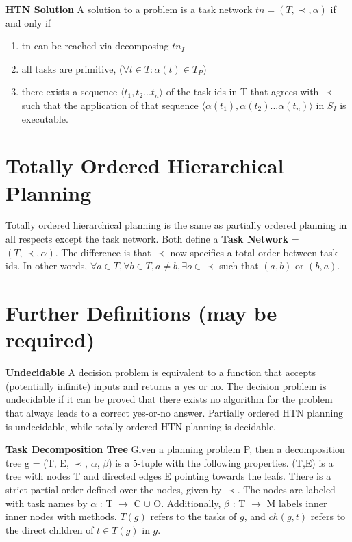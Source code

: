  
\textbf{HTN Solution}
A solution to a problem is a task network $tn = (T, \prec, \alpha)$ if and only if
\begin{enumerate}
	\item tn can be reached via decomposing $tn_I$
    \item all tasks are primitive, ($\forall t \in T: \alpha(t) \in T_P$)
    \item there exists a sequence $\langle t_1, t_2 ... t_n \rangle$ of the task ids in T
    that agrees with $\prec$ such that the application of that sequence $\langle \alpha(t_1), \alpha(t_2) ... \alpha(t_n) \rangle$ in $S_I$ is executable.
\end{enumerate}     
     
\section{Totally Ordered Hierarchical Planning}
Totally ordered hierarchical planning is the same as partially ordered planning in all respects except the task network.
Both define a \textbf{Task Network} = $(T, \prec, \alpha)$.
The difference is that $\prec$ now specifies a total order between task ids. In other words,\newline
$\forall a \in T, \forall b \in T, a \neq b, \exists o \in \prec$ such that $(a, b)$ or $(b, a)$.



\section{Further Definitions (may be required)}

\textbf{Undecidable} A decision problem is equivalent to a function that accepts (potentially infinite) inputs and returns a yes or no. The decision problem is undecidable if it can be proved that there exists no algorithm for the problem that always leads to a correct yes-or-no answer. Partially ordered HTN planning is undecidable, while totally ordered HTN planning is decidable.



\textbf{Task Decomposition Tree}
Given a planning problem P, then a decomposition tree g = (T, E, $\prec$, $\alpha$, $\beta$) is a 5-tuple with the following properties. (T,E) is a tree with nodes T and directed edges E pointing towards the leafs. There is a strict partial order defined over the nodes, given by $\prec$. The nodes are labeled with task names by $\alpha$ : T $\rightarrow$ C $\cup$ O.  Additionally, $\beta$ : T $\rightarrow$ M labels inner inner nodes with methods.
$T(g)$ refers to the tasks of $g$, and $ch(g,t)$ refers to the direct children of $t \in T(g)$ in $g$. 
 

